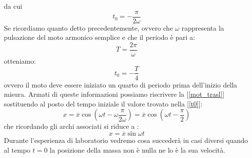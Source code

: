 \documentclass[a4paper,10pt,oneside]{article}
\begin{document}
da cui
\begin{equation}\label{t0}
 t_0=-\frac{\pi}{2\omega}
\end{equation}
Se ricordiamo quanto detto precedentemente, ovvero che $\omega$ rappresenta la pulsazione del moto armonico semplice e che il periodo è pari a:
\begin{equation}
 T=\frac{2\pi}{\omega}
\end{equation}
otteniamo:
\begin{equation}
 t_0=-\frac{T}{4}
\end{equation}
ovvero il moto deve essere iniziato un quarto di periodo prima dell'inizio della misura. Armati di queste informazioni possiamo riscrivere la [\ref{mot_trasl}] sostituendo al posto del tempo iniziale il valore trovato nella [\ref{t0}]:
\begin{equation}
 x=\overline x \cos(\omega t-\omega \frac{\pi}{2\omega})=\overline x \cos(\omega t-\frac \pi 2)
\end{equation}
che ricordando gli archi associati si riduce a :
\begin{equation}
 x=\overline x\sin\omega t
\end{equation}
Durante l'esperienza di laboratorio vedremo cosa succederà in casi diversi quando al tempo $t=0$ la posizione della massa non è nulla ne lo è la sua velocità.
\end{document}
